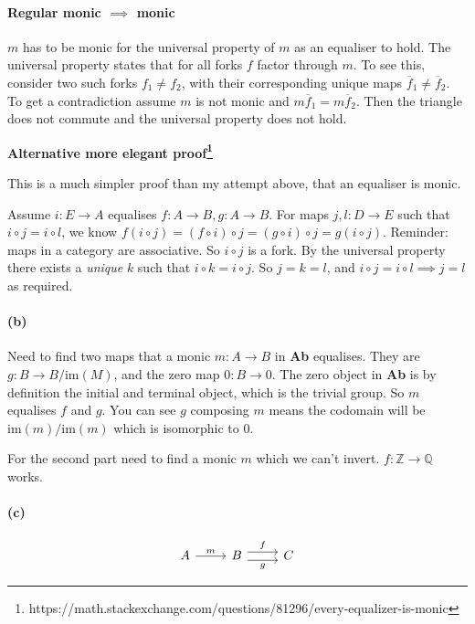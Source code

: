 \documentclass{article}
\begin{document}
\paragraph{Regular monic $\implies$ monic}

$m$ has to be monic for the universal property of $m$ as an equaliser to hold. The universal property states that for all forks $f$ factor through $m$. To see this, consider two such forks $f_1 \neq f_2$, with their corresponding unique maps $\overline{f}_1 \neq \overline{f}_2$. To get a contradiction assume $m$ is not monic and $m\overline{f}_1 = m\overline{f}_2$. Then the triangle does not commute and the universal property does not hold.

\textbf{Alternative more elegant proof\footnote{https://math.stackexchange.com/questions/81296/every-equalizer-is-monic}}

This is a much simpler proof than my attempt above, that an equaliser is monic.

Assume $i\colon E \rightarrow A$ equalises $f\colon A \rightarrow B, g\colon A \rightarrow B$.  For maps $j, l: D \rightarrow E$ such that $i \circ j = i \circ l$, we know $f (i \circ j) = (f \circ i) \circ j = (g \circ i) \circ j = g (i \circ j)$. Reminder: maps in a category are associative. So $i \circ j$ is a fork. By the universal property there exists a \textit{unique} $k$ such that $i \circ k = i \circ j$. So $j = k = l$, and $i \circ j = i \circ l \implies j = l$ as required.

\paragraph{(b)}

Need to find two maps that a monic $m\colon A \rightarrow B$ in \textbf{Ab} equalises. They are $g: B \rightarrow B/\text{im}(M)$, and the zero map $0: B \rightarrow 0$. The zero object in \textbf{Ab} is by definition the initial and terminal object, which is the trivial group. So $m$ equalises $f$ and $g$. You can see $g$ composing $m$ means the codomain will be $\text{im}(m)/\text{im}(m)$ which is isomorphic to $0$.

For the second part need to find a monic $m$ which we can't invert. $f:\mathds{Z} \rightarrow \mathds{Q}$ works.

\paragraph{(c)}

\begin{equation*}
\label{eqn5143}
\begin{tikzcd}
 A \ar[r, "m"] &
 B \ar[r,shift left=.75ex,"f"]
   \ar[r,shift right=.75ex,swap,"g"] & C
\end{tikzcd}
\end{equation*}
\end{document}
